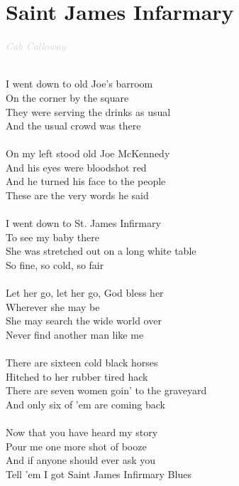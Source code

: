 \documentclass[a5paper, 10pt]{book}
\begin{document}
\section{Saint James Infarmary}\textcolor{lightgray}{\textit{Cab Calloway}}\\~\\
\begin{minipage}[t]{0.8\textwidth}
  I went down to old Joe's barroom\\
  On the corner by the square\\
  They were serving the drinks as usual\\
  And the usual crowd was there\\
  \\
  On my left stood old Joe McKennedy\\
  And his eyes were bloodshot red\\
  And he turned his face to the people\\
  These are the very words he said\\
  \\
  I went down to St. James Infirmary\\
  To see my baby there\\
  She was stretched out on a long white table\\
  So fine, so cold, so fair\\
  \\
  Let her go, let her go, God bless her\\
  Wherever she may be\\
  She may search the wide world over\\
  Never find another man like me\\
  \\
  There are sixteen cold black horses\\
  Hitched to her rubber tired hack\\
  There are seven women goin' to the graveyard\\
  And only six of 'em are coming back\\
  \\
  Now that you have heard my story\\
  Pour me one more shot of booze\\
  And if anyone should ever ask you\\
  Tell 'em I got Saint James Infirmary Blues\\
\end{minipage}
\end{document}

